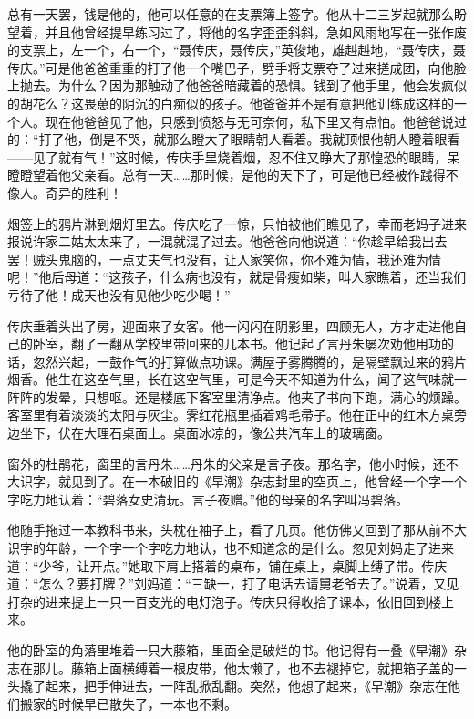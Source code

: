 \par 总有一天罢，钱是他的，他可以任意的在支票簿上签字。他从十二三岁起就那么盼望着，并且他曾经提早练习过了，将他的名字歪歪斜斜，急如风雨地写在一张作废的支票上，左一个，右一个，“聂传庆，聂传庆，”英俊地，雄赳赳地，“聂传庆，聂传庆。”可是他爸爸重重的打了他一个嘴巴子，劈手将支票夺了过来搓成团，向他脸上抛去。为什么？因为那触动了他爸爸暗藏着的恐惧。钱到了他手里，他会发疯似的胡花么？这畏葸的阴沉的白痴似的孩子。他爸爸并不是有意把他训练成这样的一个人。现在他爸爸见了他，只感到愤怒与无可奈何，私下里又有点怕。他爸爸说过的：“打了他，倒是不哭，就那么瞪大了眼睛朝人看着。我就顶恨他朝人瞪着眼看——见了就有气！”这时候，传庆手里烧着烟，忍不住又睁大了那惶恐的眼睛，呆瞪瞪望着他父亲看。总有一天……那时候，是他的天下了，可是他已经被作践得不像人。奇异的胜利！
\par 烟签上的鸦片淋到烟灯里去。传庆吃了一惊，只怕被他们瞧见了，幸而老妈子进来报说许家二姑太太来了，一混就混了过去。他爸爸向他说道：“你趁早给我出去罢！贼头鬼脑的，一点丈夫气也没有，让人家笑你，你不难为情，我还难为情呢！”他后母道：“这孩子，什么病也没有，就是骨瘦如柴，叫人家瞧着，还当我们亏待了他！成天也没有见他少吃少喝！”
\par 传庆垂着头出了房，迎面来了女客。他一闪闪在阴影里，四顾无人，方才走进他自己的卧室，翻了一翻从学校里带回来的几本书。他记起了言丹朱屡次劝他用功的话，忽然兴起，一鼓作气的打算做点功课。满屋子雾腾腾的，是隔壁飘过来的鸦片烟香。他生在这空气里，长在这空气里，可是今天不知道为什么，闻了这气味就一阵阵的发晕，只想呕。还是楼底下客室里清净点。他夹了书向下跑，满心的烦躁。客室里有着淡淡的太阳与灰尘。霁红花瓶里插着鸡毛帚子。他在正中的红木方桌旁边坐下，伏在大理石桌面上。桌面冰凉的，像公共汽车上的玻璃窗。
\par 窗外的杜鹃花，窗里的言丹朱……丹朱的父亲是言子夜。那名字，他小时候，还不大识字，就见到了。在一本破旧的《早潮》杂志封里的空页上，他曾经一个字一个字吃力地认着：“碧落女史清玩。言子夜赠。”他的母亲的名字叫冯碧落。
\par 他随手拖过一本教科书来，头枕在袖子上，看了几页。他仿佛又回到了那从前不大识字的年龄，一个字一个字吃力地认，也不知道念的是什么。忽见刘妈走了进来道：“少爷，让开点。”她取下肩上搭着的桌布，铺在桌上，桌脚上缚了带。传庆道：“怎么？要打牌？”刘妈道：“三缺一，打了电话去请舅老爷去了。”说着，又见打杂的进来提上一只一百支光的电灯泡子。传庆只得收拾了课本，依旧回到楼上来。
\par 他的卧室的角落里堆着一只大藤箱，里面全是破烂的书。他记得有一叠《早潮》杂志在那儿。藤箱上面横缚着一根皮带，他太懒了，也不去褪掉它，就把箱子盖的一头撬了起来，把手伸进去，一阵乱掀乱翻。突然，他想了起来，《早潮》杂志在他们搬家的时候早已散失了，一本也不剩。
